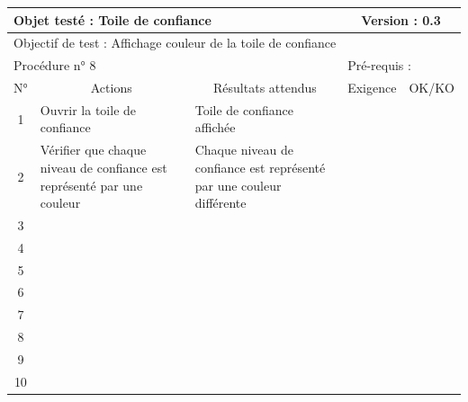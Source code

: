 \documentclass{../res/univ-projet}
\begin{document}
\begin{center}
    \begin{tabular}{|c|p{5cm}|p{5cm}|p{1.5cm}|p{1.5cm}|}
      \hline
      \multicolumn{3}{|l|}{Objet testé : Toile de confiance} & \multicolumn{2}{c|}{Version : 0.3}\\ \hline
      \multicolumn{5}{|l|}{Objectif de test : Affichage couleur de la toile de confiance}\\ \hline
      \multicolumn{3}{|l|}{Procédure n° 8} & \multicolumn{2}{p{3cm}|}{Pré-requis : }\\ \hline
      \multicolumn{1}{|c|}{N°} & \multicolumn{1}{c|}{Actions} & \multicolumn{1}{c|}{Résultats attendus} & 
      \multicolumn{1}{c|}{Exigence} & \multicolumn{1}{c|}{OK/KO}\\ \hline
      1 & Ouvrir la toile de confiance & Toile de confiance affichée &  & \\
      2 & Vérifier que chaque niveau de confiance est représenté par une couleur & Chaque niveau de confiance est représenté par une couleur différente &  & \\
      3 &  &  &  & \\ 
	  4 &  &  &  & \\
      5 &  &  &  & \\
	  6 &  &  &  & \\
      7 &  &  &  & \\
      8 &  &  &  & \\
      9 &  &  &  & \\
      10 &  &  &  &\\ 
	\hline
    \end{tabular}
    \vskip 2.2cm
    

\end{center}
\end{document}
